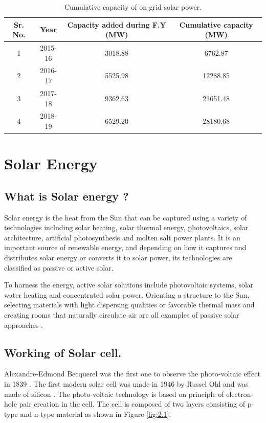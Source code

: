 \documentclass[a4paper,12pt]{iitmdiss}
\begin{document}
\begin{table}[hbt!]
    \centering
    \caption{Cumulative capacity of on-grid solar power.}
    \begin{tabular}{|c|c|c|c|}
    \hline
     Sr. No. &\textbf{Year} &\textbf{Capacity added during F.Y (MW)} &\textbf{Cumulative capacity (MW)}  \\ \hline
     1 & 2015-16 & 3018.88 & 6762.87 \\ \hline
     2 & 2016-17 & 5525.98 & 12288.85 \\ \hline
     3 & 2017-18 & 9362.63 & 21651.48 \\ \hline
     4 & 2018-19 & 6529.20 & 28180.68 \\ \hline
    \end{tabular}
    \label{tab:1.2}
    \end{table}

\chapter{Solar Energy}\label{chap:solar energy}
\section{What is Solar energy ?}
Solar energy is the heat from the Sun that can be captured using a variety of technologies including solar heating, solar thermal energy, photovoltaics, solar architecture, artificial photosynthesis and molten salt power plants. It is an important source of renewable energy, and depending on how it captures and distributes solar energy or converts it to solar power, its technologies are classified as passive or active solar.

To harness the energy, active solar solutions include photovoltaic systems, solar water heating and concentrated solar power. Orienting a structure to the Sun, selecting materials with light dispersing qualities or favorable thermal mass and creating rooms that naturally circulate air are all examples of passive solar approaches \textcolor{blue}{\cite{wikipedia_2021}}. 

\section{Working of Solar cell.}
Alexandre-Edmond Becquerel was the first one to observe the photo-voltaic effect in 1839 \textcolor{blue}{\cite{castellano2010solar}}. The first modern solar cell was made in 1946 by Russel Ohl and was made of silicon \textcolor{blue}{\cite{castellano2010solar,yadav2015enhancement}}. The photo-voltaic technology is based on principle of electron-hole pair creation in the cell. The cell is composed of two layers consisting of p-type and n-type material as shown in Figure \ref{fig:2.1}.
\end{document}
